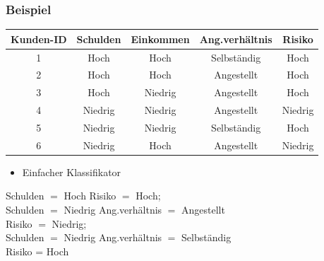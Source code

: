 \begin{frame}
\frametitle{Beispiel}

\begin{center}
{\footnotesize\begin{tabular}{|c|c|c|c|c|}
\hline
Kunden-ID & Schulden & Einkommen & Ang.verhältnis & Risiko \\
\hline\hline
1 & Hoch & Hoch & Selbständig & Hoch \\
2 & Hoch & Hoch & Angestellt & Hoch \\
3 & Hoch & Niedrig & Angestellt & Hoch \\
4 & Niedrig & Niedrig & Angestellt & Niedrig \\
5 & Niedrig & Niedrig & Selbständig & Hoch \\
6 & Niedrig & Hoch & Angestellt & Niedrig \\
\hline
\end{tabular}}
\end{center}

\begin{itemize}
\item Einfacher Klassifikator
\end{itemize}
\begin{smallalgo}
 Schulden $=$ Hoch  Risiko $=$ Hoch;\\
 Schulden $=$ Niedrig  Ang.verhältnis $=$ Angestellt \\
\1  Risiko $=$ Niedrig;\\
 Schulden $=$ Niedrig  Ang.verhältnis $=$ Selbständig \\
\1  Risiko = Hoch
\end{smallalgo}

\end{frame}


